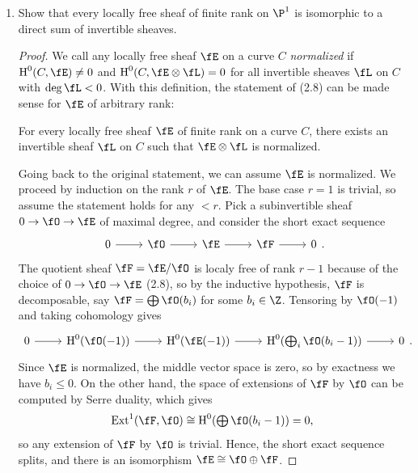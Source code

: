 \documentclass[a4paper]{article}
\begin{document}
\begin{enumerate} [label=\textbf{\arabic*.}, leftmargin=0em]
    \item Show that every locally free sheaf of finite rank on $\P^1$ is isomorphic to a direct sum of invertible sheaves.

          \begin{proof}
              We call any locally free sheaf $\fE$ on a curve $C$ \textit{normalized} if $\cH^0(C, \fE) \neq0$ and $\cH^0(C, \fE \otimes \fL) = 0$ for all invertible sheaves $\fL$ on $C$ with $\deg{\fL} < 0$.
              With this definition, the statement of (2.8) can be made sense for $\fE$ of arbitrary rank:

              \begin{lemma}
                  For every locally free sheaf $\fE$ of finite rank on a curve $C$, there exists an invertible sheaf $\fL$ on $C$ such that $\fE \otimes \fL$ is normalized.
              \end{lemma}

              Going back to the original statement, we can assume $\fE$ is normalized.
              We proceed by induction on the rank $r$ of $\fE$.
              The base case $r = 1$ is trivial, so assume the statement holds for any $< r$.
              Pick a subinvertible sheaf $0 \to \fO \to \fE$ of maximal degree, and consider the short exact sequence
              \[ \begin{tikzcd}
                      0 \arrow[r] & \fO \arrow[r] & \fE \arrow[r] & \fF \arrow[r] & 0
                  \end{tikzcd}. \]
              The quotient sheaf $\fF = \fE / \fO$ is localy free of rank $r - 1$ because of the choice of $0 \to \fO \to \fE$ (2.8), so by the inductive hypothesis, $\fF$ is decomposable, say $\fF = \bigoplus \fO(b_i)$ for some $b_i \in \Z$.
              Tensoring by $\fO(-1)$ and taking cohomology gives
              \[ \begin{tikzcd}
                      0 \arrow[r] & \cH^0(\fO(-1)) \arrow[r] & \cH^0(\fE(-1)) \arrow[r] & \cH^0(\bigoplus_i \fO(b_i - 1)) \arrow[r] & 0
                  \end{tikzcd}. \]
              Since $\fE$ is normalized, the middle vector space is zero, so by exactness we have $b_i \leq 0$.
              On the other hand, the space of extensions of $\fF$ by $\fO$ can be computed by Serre duality, which gives
              \begin{equation*}
                  \Ext^1(\fF, \fO) \cong \cH^0(\bigoplus \fO(b_i - 1)) = 0,
              \end{equation*}
              so any extension of $\fF$ by $\fO$ is trivial.
              Hence, the short exact sequence splits, and there is an isomorphism $\fE \cong \fO \oplus \fF$.
          \end{proof}


\end{enumerate}
\end{document}
